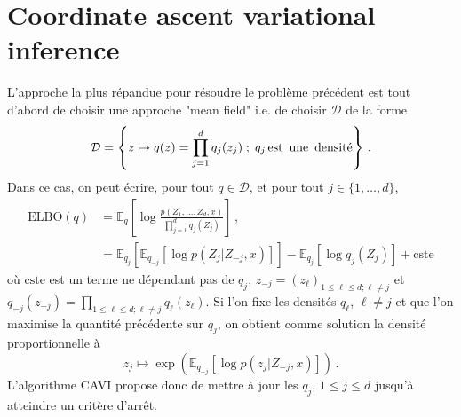 \documentclass[a4paper,10pt,fleqn]{article}
\newcommand{\1}{\ensuremath{\mathbbm{1}}}
\begin{document}
\section*{Coordinate ascent variational inference}
L'approche la plus r\'epandue pour r\'esoudre le probl\`eme pr\'ec\'edent est tout d'abord de choisir une approche "mean field" i.e. de choisir $\mathcal{D}$ de la forme 
$$
\mathcal{D} = \left\{z\mapsto q(z) = \prod_{j=1}^dq_j(z_j)\;;\; q_j \,\mbox{est\, une\, densit\'e} \right\}\,.
$$
Dans ce cas, on peut \'ecrire, pour tout $q\in \mathcal{D}$, et pour tout $j\in\{1,\ldots,d\}$,
\begin{align*}
\mathrm{ELBO}(q) &= \mathbb{E}_{q}\left[\log \frac{p(Z_1,\ldots,Z_d,x)}{\prod_{j=1}^dq_j(Z_j)}\right]\,,\\
&= \mathbb{E}_{q_j}\left[\mathbb{E}_{q_{-j}}\left[\log p(Z_j | Z_{-j},x)\right]\right] - \mathbb{E}_{q_j}\left[\log q_j(Z_j)\right]  + \mathrm{cste}
\end{align*}
o\`u $\mathrm{cste}$ est un terme ne d\'ependant pas de $q_j$,  $z_{-j} = (z_\ell)_{1\leq \ell \leq d; \ell \neq j}$ et $q_{-j}(z_{-j}) = \prod_{1\leq \ell \leq d; \ell \neq j}q_{\ell}(z_{\ell})$. Si l'on fixe les densit\'es $q_\ell$, $\ell\neq j$ et que l'on maximise la quantit\'e pr\'ec\'edente sur $q_j$, on obtient comme solution la densit\'e proportionnelle \`a
$$
z_j\mapsto \exp\left(\mathbb{E}_{q_{-j}}\left[\log p(z_j | Z_{-j},x)\right]\right)\,.
$$
L'algorithme CAVI propose donc de mettre \`a jour les $q_j$, $1\leq j \leq d$ jusqu'\`a atteindre un crit\`ere d'arr\^et.
\end{document}

